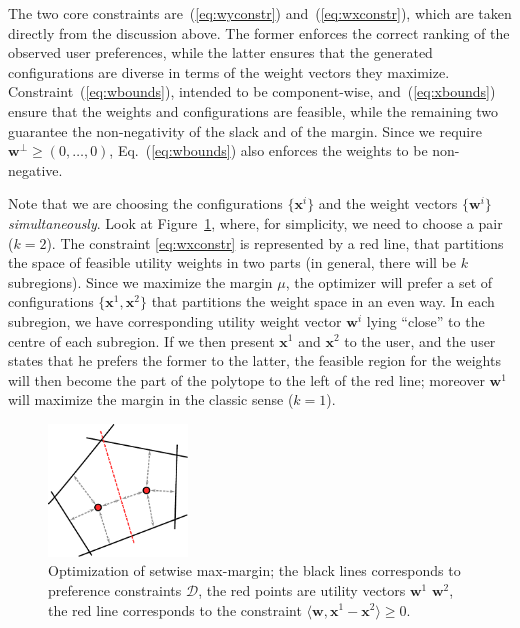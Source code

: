 \documentclass{article}
\renewcommand\[{\begin{equation}}
\renewcommand\]{\end{equation}}
\newcommand{\calvar}[1]{\ensuremath{\mathcal{#1}}}
\newcommand{\calD}{\calvar{D}}
\newcommand{\vecvar}[1]{\ensuremath{\boldsymbol{#1}}}
\newcommand{\vw}{\vecvar{w}}
\newcommand{\vx}{\vecvar{x}}
\newcommand{\paolo}[1]{{\bf \textcolor{red}{{\fbox{Paolo:} #1}}}}
\begin{document}
The two core constraints are~(\ref{eq:wyconstr}) and~(\ref{eq:wxconstr}),
which are taken directly from the discussion above. The former enforces the
correct ranking of the observed user preferences, while the latter ensures that
the generated configurations are diverse in terms of the weight vectors they
maximize. Constraint~(\ref{eq:wbounds}), intended to be component-wise, and~(\ref{eq:xbounds})
ensure that the weights and configurations are feasible, while the
remaining two guarantee the non-negativity of the slack and of the margin.
Since we require $\vw^\bot \ge (0,\ldots,0)$, Eq.~(\ref{eq:wbounds}) also enforces the weights to be non-negative.

Note that we are choosing the configurations $\{ \vx^i \}$ and the weight vectors $\{
\vw^i \}$ {\em simultaneously}.
Look at Figure~\ref{fig:setmargin}, where, for simplicity, we need to choose a pair ($k=2$). 
The constraint \ref{eq:wxconstr} is represented by a red line, that partitions the space of
feasible utility weights in two parts (in general, there will be $k$ subregions).
Since we maximize the margin $\mu$, the optimizer
will prefer a set of configurations $\{ \vx^{1}, \vx^{2} \}$ that partitions the weight space
in an even way.
In each subregion, we have corresponding utility weight vector $\vw^{i}$
lying ``close'' to the centre of each subregion. 
If we then present $\vx^{1}$ and $\vx^{2}$ to the user, and the user states that he prefers
the former to the latter, the feasible region for the weights will then become the part of the polytope to the left of the red line; moreover $\vw^{1}$ will maximize the margin in the classic sense ($k=1$).

\begin{figure}[t]
    \begin{center}
        \includegraphics[width=10em]{figures/setmargin}
    \end{center}
    \caption{\label{fig:setmargin} Optimization of setwise max-margin; the black lines corresponds to preference constraints $\calD$, the red points are utility vectors $\vw^{1}$ $\vw^{2}$, the red line corresponds to the constraint $\langle \vw, \vx^{1} - \vx^{2} \rangle \ge 0$.}
\end{figure}
\end{document}
